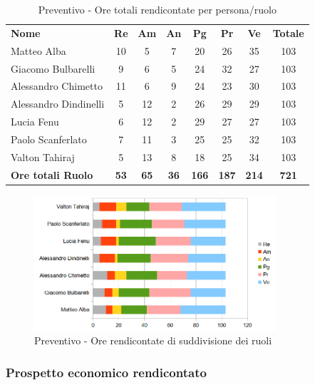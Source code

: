 		\begin{table} [h!]
			\begin{center}
				\begin{tabular} { m{3.5cm} c c c c c c c }
					\rowcolor{lightgray}
					\textbf{Nome} & \textbf{Re} & \textbf{Am} & \textbf{An} & \textbf{Pg} & \textbf{Pr} & \textbf{Ve} & \textbf{Totale} \\
					Matteo Alba & 10 & 5 & 7 & 20 & 26 & 35 & 103 \\
					Giacomo Bulbarelli & 9 & 6 & 5 & 24 & 32 & 27 & 103 \\
					Alessandro Chimetto & 11 & 6 & 9 & 24 & 23 & 30 & 103 \\
					Alessandro Dindinelli & 5 & 12 & 2 & 26 & 29 & 29 & 103 \\
					Lucia Fenu & 6 & 12 & 2 & 29 & 27 & 27 & 103 \\
					Paolo Scanferlato & 7 & 11 & 3 & 25 & 25 & 32 & 103 \\
					Valton Tahiraj & 5 & 13 & 8 & 18 & 25 & 34 & 103 \\
					\textbf{Ore totali Ruolo} & \textbf{53} & \textbf{65} & \textbf{36} & \textbf{166} & \textbf{187}& \textbf{214} & \textbf{721}
				\end{tabular}
				\caption{Preventivo - Ore totali rendicontate per persona/ruolo}
			\end{center}
		\end{table}
	
		\begin{figure} [h!]
			\centering
			\includegraphics[width=0.8\textwidth]{res/img/preventivi/totrend-barre.png}
			\caption{Preventivo - Ore rendicontate di suddivisione dei ruoli} 
		\end{figure}
	
	\newpage
	
	\subsubsection{Prospetto economico rendicontato}
	

